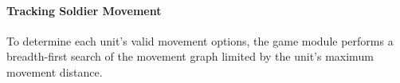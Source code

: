 \documentclass[10pt,twocolumn,letterpaper]{article}
\begin{document}
\vspace{-0.15in}
\paragraph{Tracking Soldier Movement }


To determine each unit's valid movement options, the game module
%
performs
a breadth-first search of the movement graph
limited by the unit's maximum movement distance.
%
%
\end{document}
